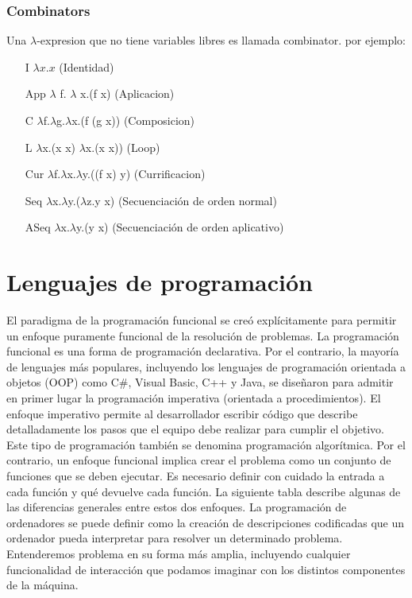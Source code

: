 \subsubsection{Combinators}
Una $\lambda$-expresion que no tiene variables libres es llamada 
combinator. por ejemplo:
\begin{itemize}
\item[I] $\lambda x.x$ (Identidad)
\item[App] $\lambda$ f. $\lambda$ x.(f x) (Aplicacion)
\item[C] $\lambda$f.$\lambda$g.$\lambda$x.(f (g x)) (Composicion)
\item[L] $\lambda$x.(x x) $\lambda$x.(x x)) (Loop)
\item[Cur] $\lambda$f.$\lambda$x.$\lambda$y.((f x) y) (Currificacion)
\item[Seq] $\lambda$x.$\lambda$y.($\lambda$z.y x) (Secuenciación de orden normal)
\item[ASeq] $\lambda$x.$\lambda$y.(y x) (Secuenciación de orden aplicativo)
\end{itemize}

\section{Lenguajes de programación}

El paradigma de la programación funcional se creó explícitamente para permitir un enfoque puramente funcional de la resolución de problemas. La programación funcional es una forma de programación declarativa. Por el contrario, la mayoría de lenguajes más populares, incluyendo los lenguajes de programación orientada a objetos (OOP) como C\#, Visual Basic, C++ y Java, se diseñaron para admitir en primer lugar la programación imperativa (orientada a procedimientos).
El enfoque imperativo permite al desarrollador escribir código que describe detalladamente los pasos que el equipo debe realizar para cumplir el objetivo. Este tipo de programación también se denomina programación algorítmica. Por el contrario, un enfoque funcional implica crear el problema como un conjunto de funciones que se deben ejecutar. Es necesario definir con cuidado la entrada a cada función y qué devuelve cada función. La siguiente tabla describe algunas de las diferencias generales entre estos dos enfoques.
La programación de ordenadores se puede definir como la creación de descripciones codificadas que un ordenador pueda interpretar para resolver un determinado problema. Entenderemos problema en su forma más amplia, incluyendo cualquier funcionalidad de interacción que podamos imaginar con los distintos componentes de la máquina.

